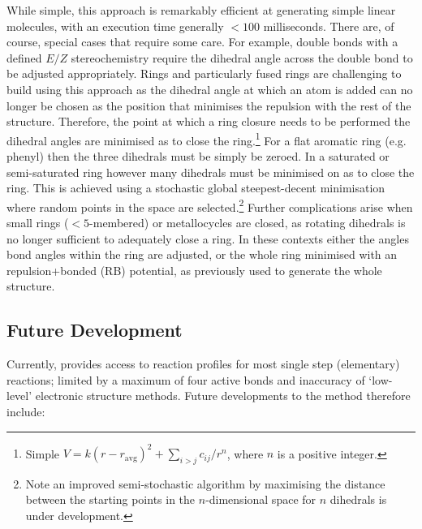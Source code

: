 \documentclass[../../main.tex]{subfiles}
\begin{document}
While simple, this approach is remarkably efficient at generating simple linear molecules, with an execution time generally $<100$ milliseconds. There are, of course, special cases that require some care. For example, double bonds with a defined $E/Z$ stereochemistry require the dihedral angle across the double bond to be adjusted appropriately. Rings and particularly fused rings are challenging to build using this approach as the dihedral angle at which an atom is added can no longer be chosen as the position that minimises the repulsion with the rest of the structure. Therefore, the point at which a ring closure needs to be performed the dihedral angles are minimised as to close the ring.\footnote{Simple $V = k(r-r_\text{avg})^2 + \sum_{i>j} {c_{ij}}/{r^n}$, where $n$ is a positive integer.} For a flat aromatic ring (e.g. phenyl) then the three dihedrals must be simply be zeroed. In a saturated or semi-saturated ring however many dihedrals must be minimised on as to close the ring. This is achieved using a stochastic global steepest-decent minimisation where random points in the space are selected.\footnote{Note an improved semi-stochastic algorithm by maximising the distance between the starting points in the $n$-dimensional space for $n$ dihedrals is under development.} Further complications arise when small rings ($< 5$-membered) or metallocycles are closed, as rotating dihedrals is no longer sufficient to adequately close a ring. In these contexts either the angles bond angles within the ring are adjusted, or the whole ring minimised with an repulsion+bonded (RB) potential, as previously used to generate the whole structure.

\newpage
\subsection{Future Development}

Currently, \ade provides access to reaction profiles for most single step (elementary) reactions; limited by a maximum of four active bonds and inaccuracy of `low-level' electronic structure methods. Future developments to the method therefore include:
\end{document}
